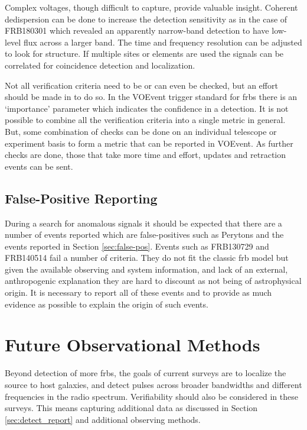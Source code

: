 \documentclass[a4paper,fleqn,usenatbib]{mnras}
\begin{document}
Complex voltages, though difficult to capture, provide valuable insight.
Coherent dedispersion can be done to increase the detection sensitivity as in
the case of FRB180301 \citep{atel11376} which revealed an apparently narrow-band
detection to have low-level flux across a larger band. The time and frequency
resolution can be adjusted to look for structure. If multiple sites or elements
are used the signals can be correlated for coincidence detection and
localization.

Not all verification criteria need to be or can even be checked, but an effort
should be made in to do so. In the VOEvent trigger standard for \glspl{frb}
\citep{2017arXiv171008155P} there is an `importance' parameter which indicates
the confidence in a detection. It is not possible to combine all the
verification criteria into a single metric in general. But, some combination of
checks can be done on an individual telescope or experiment basis to form a
metric that can be reported in VOEvent. As further checks are done, those that
take more time and effort, updates and retraction events can be sent.

\subsection{False-Positive Reporting}

During a search for anomalous signals it should be expected that there are a
number of events reported which are false-positives such as Perytons
\citep{2011ApJ...727...18B} and the events reported in Section
\ref{sec:false-pos}.  Events such as FRB130729 and FRB140514 fail a number of
criteria. They do not fit the classic \gls{frb} model but given the available
observing and system information, and lack of an external, anthropogenic
explanation they are hard to discount as not being of astrophysical origin. It
is necessary to report all of these events and to provide as much evidence as
possible to explain the origin of such events.

\section{Future Observational Methods}

Beyond detection of more \glspl{frb}, the goals of current surveys are to
localize the source to host galaxies, and detect pulses across broader
bandwidths and different frequencies in the radio spectrum. Verifiability should
also be considered in these surveys. This means capturing additional data as
discussed in Section \ref{sec:detect_report} and additional observing methods.
\end{document}
